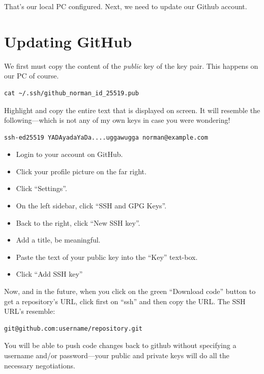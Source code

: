 That's our local PC configured. Next, we need to update our Github account.

\section{Updating GitHub}

We first must copy the content of the \emph{public} key of the key pair. This happens on our PC of course.

\begin{lstlisting}
cat ~/.ssh/github_norman_id_25519.pub
\end{lstlisting}

Highlight and copy the entire text that is displayed on screen. It will resemble the following---which is not any of my own keys in case you were wondering!

\begin{lstlisting}
ssh-ed25519 YADAyadaYaDa....uggawugga norman@example.com
\end{lstlisting}

\begin{itemize}
    \item Login to your account on GitHub.
    \item Click your profile picture on the far right.
    \item Click ``Settings''.
    \item On the left sidebar, click ``SSH and GPG Keys''.
    \item Back to the right, click ``New SSH key''.
    \item Add a title, be meaningful.
    \item Paste the text of your public key into the ``Key'' text-box.
    \item Click ``Add SSH key''
\end{itemize}

Now, and in the future, when you click on the green ``Download code'' button to get a repository's URL, click first on ``ssh'' and then copy the URL. The SSH URL's resemble:

\begin{lstlisting}
git@github.com:username/repository.git
\end{lstlisting}

You will be able to push code changes back to github without specifying a username and/or password---your public and private keys will do all the necessary negotiations.